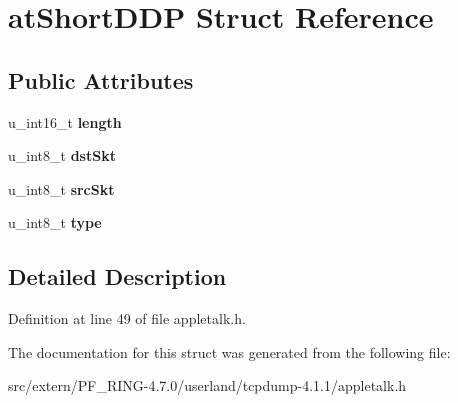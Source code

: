 \hypertarget{structat_short_d_d_p}{
\section{atShortDDP Struct Reference}
\label{structat_short_d_d_p}
}
\subsection*{Public Attributes}
\begin{DoxyCompactItemize}
\item 
\hypertarget{structat_short_d_d_p_a3379a650a4cd9e380cda59e56f276314}{
u\_\-int16\_\-t {\bfseries length}}
\label{structat_short_d_d_p_a3379a650a4cd9e380cda59e56f276314}

\item 
\hypertarget{structat_short_d_d_p_a72669081f01edd8efb41403f8e293bcf}{
u\_\-int8\_\-t {\bfseries dstSkt}}
\label{structat_short_d_d_p_a72669081f01edd8efb41403f8e293bcf}

\item 
\hypertarget{structat_short_d_d_p_ae30d1f3ca871082d4837340fb930b9b2}{
u\_\-int8\_\-t {\bfseries srcSkt}}
\label{structat_short_d_d_p_ae30d1f3ca871082d4837340fb930b9b2}

\item 
\hypertarget{structat_short_d_d_p_a71ba4fca1985af2b8ee191c897e99f63}{
u\_\-int8\_\-t {\bfseries type}}
\label{structat_short_d_d_p_a71ba4fca1985af2b8ee191c897e99f63}

\end{DoxyCompactItemize}


\subsection{Detailed Description}


Definition at line 49 of file appletalk.h.



The documentation for this struct was generated from the following file:\begin{DoxyCompactItemize}
\item 
src/extern/PF\_\-RING-\/4.7.0/userland/tcpdump-\/4.1.1/appletalk.h\end{DoxyCompactItemize}
